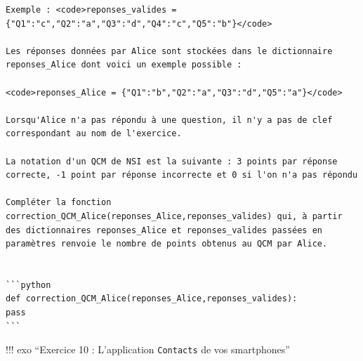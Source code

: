 \documentclass[
]{article}
\begin{document}
\begin{verbatim}
Exemple : <code>reponses_valides = {"Q1":"c","Q2":"a","Q3":"d","Q4":"c","Q5":"b"}</code>

Les réponses données par Alice sont stockées dans le dictionnaire reponses_Alice dont voici un exemple possible :

<code>reponses_Alice = {"Q1":"b","Q2":"a","Q3":"d","Q5":"a"}</code>

Lorsqu'Alice n'a pas répondu à une question, il n'y a pas de clef correspondant au nom de l'exercice.

La notation d'un QCM de NSI est la suivante : 3 points par réponse correcte, -1 point par réponse incorrecte et 0 si l'on n'a pas répondu

Compléter la fonction correction_QCM_Alice(reponses_Alice,reponses_valides) qui, à partir des dictionnaires reponses_Alice et reponses_valides passées en paramètres renvoie le nombre de points obtenus au QCM par Alice.


```python
def correction_QCM_Alice(reponses_Alice,reponses_valides):
pass
```
\end{verbatim}

!!! exo ``Exercice 10 : L'application \texttt{Contacts} de vos
smartphones''
\end{document}
